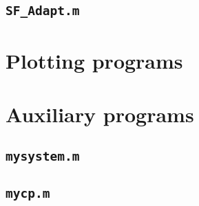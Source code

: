 \subsection{\texttt{SF\_Adapt.m}}

\section{Plotting programs}



\section{Auxiliary programs}

\subsection{\texttt{mysystem.m}}

\subsection{\texttt{mycp.m}}



